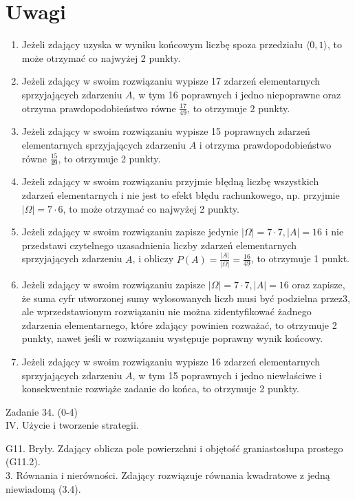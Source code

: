 \documentclass[10pt]{article}
\begin{document}
\section*{Uwagi}
\begin{enumerate}
  \item Jeżeli zdający uzyska w wyniku końcowym liczbę spoza przedziału $\langle 0,1\rangle$, to może otrzymać co najwyżej 2 punkty.
  \item Jeżeli zdający w swoim rozwiązaniu wypisze 17 zdarzeń elementarnych sprzyjających zdarzeniu $A$, w tym 16 poprawnych i jedno niepoprawne oraz otrzyma prawdopodobieństwo równe $\frac{17}{49}$, to otrzymuje 2 punkty.
  \item Jeżeli zdający w swoim rozwiązaniu wypisze 15 poprawnych zdarzeń elementarnych sprzyjających zdarzeniu $A$ i otrzyma prawdopodobieństwo równe $\frac{15}{49}$, to otrzymuje 2 punkty.
  \item Jeżeli zdający w swoim rozwiązaniu przyjmie błędną liczbę wszystkich zdarzeń elementarnych i nie jest to efekt błędu rachunkowego, np. przyjmie $|\Omega|=7 \cdot 6$, to może otrzymać co najwyżej 2 punkty.
  \item Jeżeli zdający w swoim rozwiązaniu zapisze jedynie $|\Omega|=7 \cdot 7,|A|=16$ i nie przedstawi czytelnego uzasadnienia liczby zdarzeń elementarnych sprzyjających zdarzeniu $A$, i obliczy $P(A)=\frac{|A|}{|\Omega|}=\frac{16}{49}$, to otrzymuje 1 punkt.
  \item Jeżeli zdający w swoim rozwiązaniu zapisze $|\Omega|=7 \cdot 7,|A|=16$ oraz zapisze, że suma cyfr utworzonej sumy wylosowanych liczb musi być podzielna przez3, ale wprzedstawionym rozwiązaniu nie można zidentyfikować żadnego zdarzenia elementarnego, które zdający powinien rozważać, to otrzymuje 2 punkty, nawet jeśli w rozwiązaniu występuje poprawny wynik końcowy.
  \item Jeżeli zdający w swoim rozwiązaniu wypisze 16 zdarzeń elementarnych sprzyjających zdarzeniu $A$, w tym 15 poprawnych i jedno niewłaściwe i konsekwentnie rozwiąże zadanie do końca, to otrzymuje 2 punkty.
\end{enumerate}

Zadanie 34. (0-4)\\
IV. Użycie i tworzenie strategii.

G11. Bryły. Zdający oblicza pole powierzchni i objętość graniastosłupa prostego (G11.2).\\
3. Równania i nierówności. Zdający rozwiązuje równania kwadratowe z jedną niewiadomą (3.4).
\end{document}
